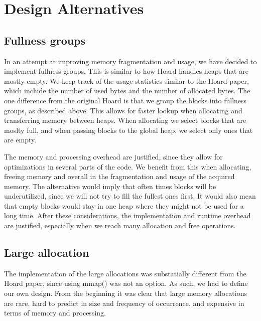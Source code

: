 \documentclass{article}
\begin{document}
\newpage
\section{Design Alternatives}
\label{sec:alternatives}

\subsection{Fullness groups}
In an attempt at improving memory fragmentation and usage, we have decided to
implement fullness groups. This is similar to how Hoard handles heaps that
are mostly empty. We keep track of the usage statistics similar to the Hoard
paper, which include the number of used bytes and the number of allocated bytes.
The one difference from the original Hoard is that we group the blocks into 
fullness groups, as described above. This allows for faster lookup when 
allocating and transferring memory between heaps. When allocating we select 
blocks that are moslty full, and when passing blocks to the global heap, we 
select only ones that are empty.

The memory and processing overhead are justified, since they allow for 
optimizations in several parts of the code. We benefit from this when 
allocating, freeing memory and overall in the fragmentation and usage of the 
acquired memory. The alternative would imply that often times blocks will be
underutilized, since we will not try to fill the fullest ones first. It would
also mean that empty blocks would stay in one heap where they might not be 
used for a long time. After these considerations, the implementation and 
runtime overhead are justified, especially when we reach many allocation and 
free operations.


\subsection{Large allocation}
The implementation of the large allocations was substatially different from
the Hoard paper, since using mmap() was not an option. As such, we had to
define our own design. From the beginning it was clear that large memory 
allocations are rare, hard to predict in size and frequency of occurrence, and
expensive in terms of memory and processing.
\end{document}
